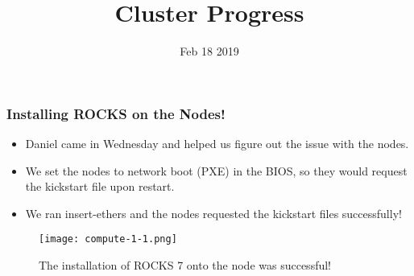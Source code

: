 \documentclass{beamer}
\title{Cluster Progress}
\date{Feb 18 2019}
\begin{document}

\begin{frame}
  \maketitle
\end{frame}



\begin{frame}

  \frametitle{Installing ROCKS on the Nodes!}

  \begin{itemize}
  \item Daniel came in Wednesday and helped us figure out the issue with the nodes.
  \item We set the nodes to network boot (PXE) in the BIOS, so they would request the kickstart file upon restart.
    \item We ran insert-ethers and the nodes requested the kickstart files successfully!
  \end{itemize}

  \begin{figure}[H]
    \begin{center}
      \texttt{[image: compute-1-1.png]}
    \end{center}
    \caption{The installation of ROCKS 7 onto the node was successful!}
  \end{figure}

\end{frame}
\end{document}
